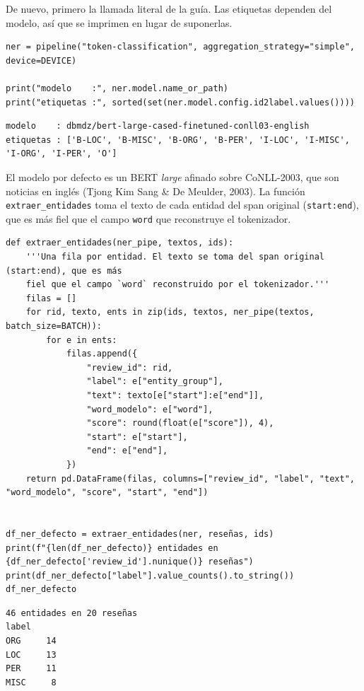 \documentclass[12pt,a4paper]{article}
\begin{document}
De nuevo, primero la llamada literal de la guía. Las etiquetas dependen del modelo, así que se
imprimen en lugar de suponerlas.

\begin{lstlisting}[style=codigo]
ner = pipeline("token-classification", aggregation_strategy="simple", device=DEVICE)

print("modelo    :", ner.model.name_or_path)
print("etiquetas :", sorted(set(ner.model.config.id2label.values())))
\end{lstlisting}

\begin{lstlisting}[style=salida]
modelo    : dbmdz/bert-large-cased-finetuned-conll03-english
etiquetas : ['B-LOC', 'B-MISC', 'B-ORG', 'B-PER', 'I-LOC', 'I-MISC', 'I-ORG', 'I-PER', 'O']
\end{lstlisting}


El modelo por defecto es un BERT \emph{large} afinado sobre CoNLL-2003, que son noticias en inglés
(Tjong Kim Sang \& De Meulder, 2003). La función \texttt{extraer\_entidades} toma el texto de cada
entidad del span original (\texttt{start:end}), que es más fiel que el campo \texttt{word} que
reconstruye el tokenizador.

\begin{lstlisting}[style=codigo]
def extraer_entidades(ner_pipe, textos, ids):
    '''Una fila por entidad. El texto se toma del span original (start:end), que es más
    fiel que el campo `word` reconstruido por el tokenizador.'''
    filas = []
    for rid, texto, ents in zip(ids, textos, ner_pipe(textos, batch_size=BATCH)):
        for e in ents:
            filas.append({
                "review_id": rid,
                "label": e["entity_group"],
                "text": texto[e["start"]:e["end"]],
                "word_modelo": e["word"],
                "score": round(float(e["score"]), 4),
                "start": e["start"],
                "end": e["end"],
            })
    return pd.DataFrame(filas, columns=["review_id", "label", "text", "word_modelo", "score", "start", "end"])


df_ner_defecto = extraer_entidades(ner, reseñas, ids)
print(f"{len(df_ner_defecto)} entidades en {df_ner_defecto['review_id'].nunique()} reseñas")
print(df_ner_defecto["label"].value_counts().to_string())
df_ner_defecto
\end{lstlisting}

\begin{lstlisting}[style=salida]
46 entidades en 20 reseñas
label
ORG     14
LOC     13
PER     11
MISC     8
\end{lstlisting}
\end{document}

